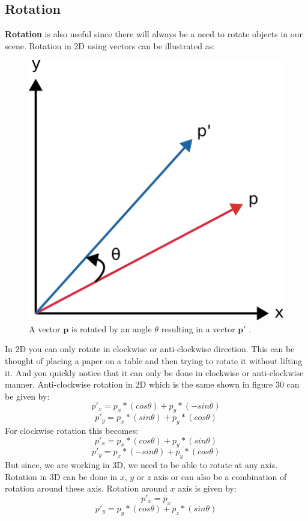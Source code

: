 \documentclass[11pt,a4paper]{article}
\begin{document}
	\subsection{Rotation}
	\textbf{Rotation} is also useful since there will always be a need to rotate objects in our scene. Rotation in 2D using vectors can be illustrated as:
	\begin{figure}[H]
		\centering
		\captionsetup{justification=centering}
		\includegraphics[width=.28\textwidth]{rotation.png}\quad
		\caption{A vector $\boldsymbol{p}$ is rotated by an angle $\theta$ resulting in a vector $\boldsymbol{p'}$ \protect\cite{2dtransformations}.}
	\end{figure}
	\noindent
	In 2D you can only rotate in clockwise or anti-clockwise direction. This can be thought of placing a paper on a table and then trying to rotate it without lifting it. And you quickly notice that it can only be done in clockwise or anti-clockwise manner. Anti-clockwise rotation in 2D which is the same shown in figure 30 can be given by:
	\begin{equation}
	p'_{x} = p_{x}*(cos\theta) + p_{y}*(-sin\theta)
	\end{equation}
	\begin{equation}
	p'_{y} = p_{x}*(sin\theta) + p_{y}*(cos\theta)
	\end{equation}
	For clockwise rotation this becomes:
	\begin{equation}
	p'_{x} = p_{x}*(cos\theta) + p_{y}*(sin\theta)
	\end{equation}
	\begin{equation}
	p'_{y} = p_{x}*(-sin\theta) + p_{y}*(cos\theta)
	\end{equation}
	But since, we are working in 3D, we need to be able to rotate at any axis. Rotation in 3D can be done in $x$, $y$ or $z$ axis or can also be a combination of rotation around these axis. Rotation around $x$ axis is given by:
	\begin{equation}
	p'_{x} = p_{x}
	\end{equation}
	\begin{equation}
	p'_{y} = p_{y}*(cos\theta) + p_{z}*(sin\theta)
	\end{equation}
\end{document}
